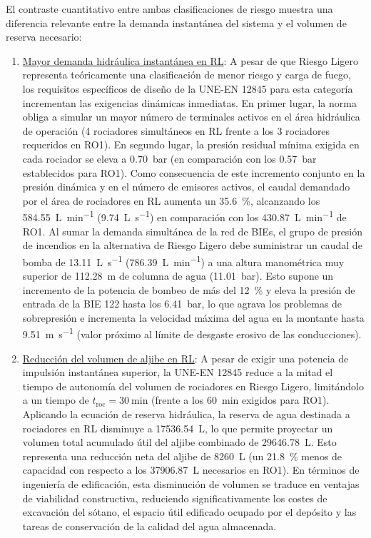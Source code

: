 \documentclass[12pt,a4paper]{article}
\begin{document}
El contraste cuantitativo entre ambas clasificaciones de riesgo muestra una diferencia relevante entre la demanda instantánea del sistema y el volumen de reserva necesario:
\begin{enumerate}
	\item \underline{Mayor demanda hidráulica instantánea en RL}: A pesar de que Riesgo Ligero representa teóricamente una clasificación de menor riesgo y carga de fuego, los requisitos específicos de diseño de la UNE-EN 12845 para esta categoría incrementan las exigencias dinámicas inmediatas. En primer lugar, la norma obliga a simular un mayor número de terminales activos en el área hidráulica de operación (4 rociadores simultáneos en RL frente a los 3 rociadores requeridos en RO1). En segundo lugar, la presión residual mínima exigida en cada rociador se eleva a \SI{0.70}{\bar} (en comparación con los \SI{0.57}{\bar} establecidos para RO1). Como consecuencia de este incremento conjunto en la presión dinámica y en el número de emisores activos, el caudal demandado por el área de rociadores en RL aumenta un \SI{35.6}{\percent}, alcanzando los \SI{584.55}{\liter\per\minute} (\SI{9.74}{\liter\per\second}) en comparación con los \SI{430.87}{\liter\per\minute} de RO1. Al sumar la demanda simultánea de la red de BIEs, el grupo de presión de incendios en la alternativa de Riesgo Ligero debe suministrar un caudal de bomba de \SI{13.11}{\liter\per\second} (\SI{786.39}{\liter\per\minute}) a una altura manométrica muy superior de \SI{112.28}{\meter} de columna de agua (\SI{11.01}{\bar}). Esto supone un incremento de la potencia de bombeo de más del \SI{12}{\percent} y eleva la presión de entrada de la BIE 122 hasta los \SI{6.41}{\bar}, lo que agrava los problemas de sobrepresión e incrementa la velocidad máxima del agua en la montante hasta \SI{9.51}{\meter\per\second} (valor próximo al límite de desgaste erosivo de las conducciones).
	\item \underline{Reducción del volumen de aljibe en RL}: A pesar de exigir una potencia de impulsión instantánea superior, la UNE-EN 12845 reduce a la mitad el tiempo de autonomía del volumen de rociadores en Riesgo Ligero, limitándolo a un tiempo de $t_{\text{roc}} = \SI{30}{\minute}$ (frente a los \SI{60}{\minute} exigidos para RO1). Aplicando la ecuación de reserva hidráulica, la reserva de agua destinada a rociadores en RL disminuye a \SI{17536.54}{\liter}, lo que permite proyectar un volumen total acumulado útil del aljibe combinado de \SI{29646.78}{\liter}. Esto representa una reducción neta del aljibe de \SI{8260}{\liter} (un \SI{21.8}{\percent} menos de capacidad con respecto a los \SI{37906.87}{\liter} necesarios en RO1). En términos de ingeniería de edificación, esta disminución de volumen se traduce en ventajas de viabilidad constructiva, reduciendo significativamente los costes de excavación del sótano, el espacio útil edificado ocupado por el depósito y las tareas de conservación de la calidad del agua almacenada.

\end{enumerate}
\end{document}
